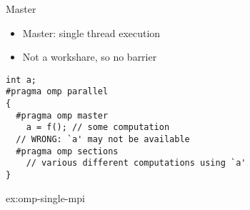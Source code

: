 \begin{numberedframe}{Master}
  \begin{itemize}
  \item Master: single thread execution
  \item Not a workshare, so no barrier
  \end{itemize}
\begin{verbatim}
int a;
#pragma omp parallel
{
  #pragma omp master
    a = f(); // some computation
  // WRONG: `a' may not be available
  #pragma omp sections
    // various different computations using `a'
}
\end{verbatim}
\end{numberedframe}

\begin{exerciseframe}
   {ex:omp-single-mpi}
\end{exerciseframe}

\endinput

\begin{numberedframe}{}
  \begin{itemize}
  \item 
  \end{itemize}
\end{numberedframe}

\begin{numberedframe}{}
  \begin{itemize}
  \item 
  \end{itemize}
\end{numberedframe}

\begin{numberedframe}{}
  \begin{itemize}
  \item 
  \end{itemize}
\end{numberedframe}

\begin{numberedframe}{}
  \begin{itemize}
  \item 
  \end{itemize}
\end{numberedframe}

\begin{numberedframe}{}
  \begin{itemize}
  \item 
  \end{itemize}
\end{numberedframe}

